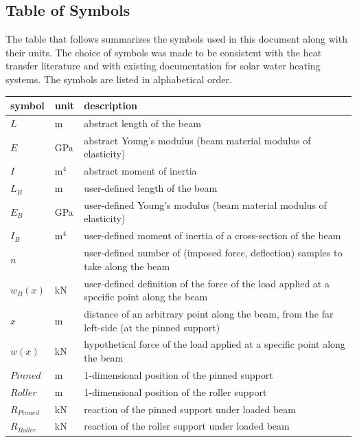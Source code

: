 \documentclass[12pt]{article}
\begin{document}
\subsection{Table of Symbols}

The table that follows summarizes the symbols used in this document along with
their units.  The choice of symbols was made to be consistent with the heat
transfer literature and with existing documentation for solar water heating
systems.  The symbols are listed in alphabetical order.

\renewcommand{\arraystretch}{1.2}
\noindent
\begin{longtable*}{l l p{12cm}}
    \toprule
    \textbf{symbol} & \textbf{unit} & \textbf{description}\\
    \midrule
    \(L\) & \si{\metre} & abstract length of the beam \\
    \(E\) & \si{\giga\pascal} & abstract Young's modulus (beam material modulus of elasticity) \\
    \(I\) & \(\si{\metre{}}^{4}\) & abstract moment of inertia \\
    \(L_{B}\) & \si{\metre} & user-defined length of the beam \\
    \(E_{B}\) & \si{\giga\pascal} & user-defined Young's modulus (beam material modulus of elasticity) \\
    \(I_{B}\) & \(\si{\metre{}}^{4}\) & user-defined moment of inertia of a cross-section of the beam \\
    \(n\) & \textemdash{} & user-defined number of (imposed force, deflection) samples to take along the beam \\
    \(w_B(x)\) & \si{\kilo\newton} & user-defined definition of the force of the load applied at a specific point along the beam \\
    \(x\) & \si{\metre} & distance of an arbitrary point along the beam, from the far left-side (at the pinned support) \\
    \(w(x)\) & \si{\kilo\newton} & hypothetical force of the load applied at a specific point along the beam \\
    \(\mathit{Pinned}\) & \si{\metre} & 1-dimensional position of the pinned support \\
    \(\mathit{Roller}\) & \si{\metre} & 1-dimensional position of the roller support \\
    \(R_{\mathit{Pinned}}\) & \si{\kilo\newton} & reaction of the pinned support under loaded beam \\
    \(R_{\mathit{Roller}}\) & \si{\kilo\newton} & reaction of the roller support under loaded beam \\

\end{longtable*}
\end{document}
